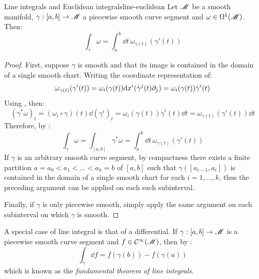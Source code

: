 \begin{proposition}{Line integrals and Euclidean integrals}{line-euclidean}
  Let $ \mathscr{M} $ be a smooth manifold, $ \gamma : [a,b] \rightarrow \mathscr{M} $ a piecewise smooth curve segment and $ \omega \in \Omega^{1}(\mathscr{M}) $. Then:
  \begin{equation}
    \int_\gamma \omega = \int_a^b \dd t \, \omega_{\gamma(t)}(\gamma'(t))
  \end{equation}
\end{proposition}

\begin{proofbox}
  \begin{proof}
    First, suppose $ \gamma $ is smooth and that its image is contained in the domain of a single smooth chart. Writing the coordinate representation of:
    \begin{equation*}
      \omega_{\gamma(t)}(\gamma'(t)) = \omega_i(\gamma(t)) \mathrm{d} x^i (\dot{\gamma}^j(t) \partial_j) = \omega_i(\gamma(t)) \dot{\gamma}^i(t)
    \end{equation*}
    Using , then:
    \begin{equation*}
      (\gamma^* \omega)_t = (\omega_i \circ \gamma)(t) \dd (\gamma^i)_t = \omega_i(\gamma(t)) \dot{\gamma}^i(t) \dd t = \omega_{\gamma(t)}(\gamma'(t)) \dd t
    \end{equation*}
    Therefore, by :
    \begin{equation*}
      \int_\gamma \omega = \int_{[a,b]} \gamma^* \omega = \int_a^b \dd t \, \omega_{\gamma(t)}(\gamma'(t))
    \end{equation*}
    If $ \gamma $ is an arbitrary smooth curve segment, by compactness there exists a finite partition $ a = a_0 < a_1 < \dots < a_k = b $ of $ [a,b] $ such that $ \gamma([a_{i-1} , a_i]) $ is contained in the domain of a single smooth chart for each $ i = 1 , \dots , k $, thus the preceding argument can be applied on each such subinterval.

    Finally, if $ \gamma $ is only piecewise smooth, simply apply the same argument on each subinterval on which $ \gamma $ is smooth.
  \end{proof}
\end{proofbox}

A special case of line integral is that of a differential. If $ \gamma : [a,b] \rightarrow \mathscr{M} $ is a piecewise smooth curve segment and $ f \in \mathcal{C}^{\infty}(\mathscr{M}) $, then by :
\begin{equation}
  \int_\gamma \dd f = f(\gamma(b)) - f(\gamma(a))
  \label{eq:fundamental-th-line-integrals}
\end{equation}
which is known as the \emph{fundamental theorem of line integrals}.

